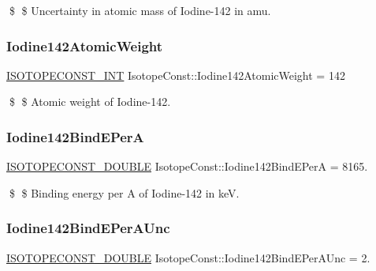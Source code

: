 \$ \$ Uncertainty in atomic mass of Iodine-\/142 in amu. \mbox{\label{group___isotope_const-_iodine-_i142_gaa60c1c5d40c972c8b5dc68851c13af25}} 
\subsubsection{\texorpdfstring{Iodine142\+Atomic\+Weight}{Iodine142AtomicWeight}}
{\footnotesize\ttfamily \mbox{\hyperlink{group___isotope_const-_macros_ga5f18360b3e99483a35c32d789e62621c}{I\+S\+O\+T\+O\+P\+E\+C\+O\+N\+S\+T\+\_\+\+I\+NT}} Isotope\+Const\+::\+Iodine142\+Atomic\+Weight = 142}

\$ \$ Atomic weight of Iodine-\/142. \mbox{\label{group___isotope_const-_iodine-_i142_ga91fef62084493c6d1e2209116604b5f2}} 
\subsubsection{\texorpdfstring{Iodine142\+Bind\+E\+PerA}{Iodine142BindEPerA}}
{\footnotesize\ttfamily \mbox{\hyperlink{group___isotope_const-_macros_ga8f45a7272ce02c0b4c65c44636ed719a}{I\+S\+O\+T\+O\+P\+E\+C\+O\+N\+S\+T\+\_\+\+D\+O\+U\+B\+LE}} Isotope\+Const\+::\+Iodine142\+Bind\+E\+PerA = 8165.}

\$ \$ Binding energy per A of Iodine-\/142 in keV. \mbox{\label{group___isotope_const-_iodine-_i142_gaf5b51ea7bb46eaacd254627f42d371cd}} 
\subsubsection{\texorpdfstring{Iodine142\+Bind\+E\+Per\+A\+Unc}{Iodine142BindEPerAUnc}}
{\footnotesize\ttfamily \mbox{\hyperlink{group___isotope_const-_macros_ga8f45a7272ce02c0b4c65c44636ed719a}{I\+S\+O\+T\+O\+P\+E\+C\+O\+N\+S\+T\+\_\+\+D\+O\+U\+B\+LE}} Isotope\+Const\+::\+Iodine142\+Bind\+E\+Per\+A\+Unc = 2.}

